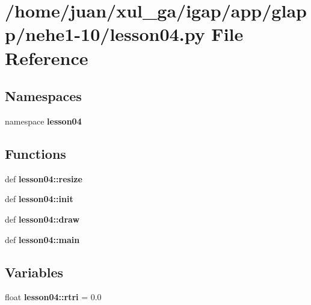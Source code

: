 \section{/home/juan/xul\_\-ga/igap/app/glapp/nehe1-10/lesson04.py File Reference}
\label{nehe1-10_2lesson04_8py}
\subsection*{Namespaces}
\begin{CompactItemize}
\item 
namespace {\bf lesson04}
\end{CompactItemize}
\subsection*{Functions}
\begin{CompactItemize}
\item 
def {\bf lesson04::resize}
\item 
def {\bf lesson04::init}
\item 
def {\bf lesson04::draw}
\item 
def {\bf lesson04::main}
\end{CompactItemize}
\subsection*{Variables}
\begin{CompactItemize}
\item 
float {\bf lesson04::rtri} = 0.0
\end{CompactItemize}

